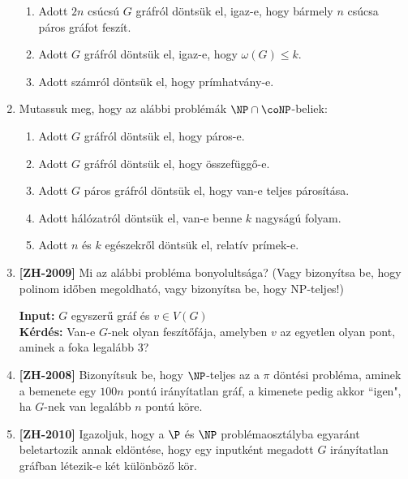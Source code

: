 \documentclass[a4paper, 12pt]{article}
\begin{document}
\begin{enumerate}
\begin{enumerate}
                \item Adott $2n$ csúcsú $G$ gráfról döntsük el, igaz-e, hogy bármely $n$ csúcsa páros gráfot feszít.
                \item Adott $G$ gráfról döntsük el, igaz-e, hogy $\omega(G)\leq k$.
                \item Adott számról döntsük el, hogy prímhatvány-e.
            \end{enumerate}
            \item Mutassuk meg, hogy az alábbi problémák $\NP \cap \coNP$-beliek:
            \begin{enumerate}
                \item Adott $G$ gráfról döntsük el, hogy páros-e.
                \item Adott $G$ gráfról döntsük el, hogy összefüggő-e.
                \item Adott $G$ páros gráfról döntsük el, hogy van-e teljes párosítása.
                \item Adott hálózatról döntsük el, van-e benne $k$ nagyságú folyam.
                \item Adott $n$ és $k$ egészekről döntsük el, relatív prímek-e.
            \end{enumerate}
            \item \textbf{[ZH-2009]} Mi az alábbi probléma bonyolultsága? (Vagy bizonyítsa be, hogy polinom időben megoldható, vagy bizonyítsa be, hogy NP-teljes!)
            
            \textbf{Input:} $G$ egyszerű gráf és $v\in V(G)$\\
            \textbf{Kérdés:} Van-e $G$-nek olyan feszítőfája, amelyben $v$ az egyetlen olyan pont, aminek a foka legalább $3$?

            \item \textbf{[ZH-2008]} Bizonyítsuk be, hogy $\NP$-teljes az a $\pi$ döntési probléma, aminek a bemenete egy $100n$ pontú irányítatlan gráf, a kimenete pedig akkor ``igen", ha $G$-nek van legalább $n$ pontú köre. 
            
            \item \textbf{[ZH-2010]} Igazoljuk, hogy a $\P$ és $\NP$ problémaosztályba egyaránt beletartozik annak eldöntése, hogy egy inputként megadott $G$ irányítatlan gráfban létezik-e két különböző kör.
            

\end{enumerate}
\end{document}
